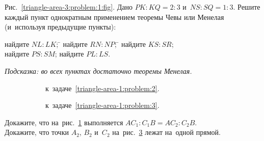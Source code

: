 \begin{problems}

\item
\label{triangle-area-3:problem:1}%
Рис.~\ref{triangle-area-3:problem:1:fig}.
Дано $PK : KQ = 2 : 3$ и~$NS : SQ = 1 : 3$.
Решите каждый пункт однократным применением теоремы Чевы или Менелая
(и~используя предыдущие пункты):
\begingroup \parskip=0pt
\begin{tabbing}
\subproblem
найдите $NL : LK$;
\qquad\=
\subproblem
найдите $RN : NP$;
\qquad\=
\subproblem
найдите $KS : SR$;
\\
\subproblem
найдите $PS : SM$;
\qquad\>
\subproblem
найдите $PL : LS$.
\end{tabbing}
\emph{Подсказка: во всех пунктах достаточно теоремы Менелая.}
\endgroup %

\begin{figure}[hb]
\leavevmode\null\hfill
    \begin{subfigure}{0.42\textwidth}
        \caption{к~задаче~\ref{triangle-area-1:problem:2}.}
        \label{triangle-area-3:problem:2:fig}
    \end{subfigure}
\hfill
    \begin{subfigure}{0.3\textwidth}
        \caption{к~задаче~\ref{triangle-area-1:problem:3}.}
        \label{triangle-area-3:problem:3:fig}
    \end{subfigure}
\hfill\null\par
    \caption{}
\end{figure}


\item
\subproblem
\label{triangle-area-1:problem:2}%
Докажите, что
на~рис.~\ref{triangle-area-3:problem:2:fig}
выполняется $A C_1 : C_1 B = A C_2 : C_2 B$.
\\
\subproblemx{*}
\label{triangle-area-1:problem:3}%
Докажите, что точки $A_2$, $B_2$ и~$C_2$
на~рис.~\ref{triangle-area-3:problem:3:fig}
лежат на~одной прямой.

\end{problems}


